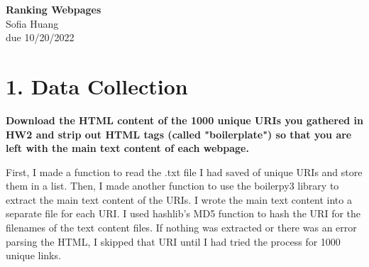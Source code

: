 \documentclass[12pt]{article}
\begin{document}
\begin{centering}
{\large\textbf{Ranking Webpages}}\\ 
Sofia Huang\\
due 10/20/2022\\
\end{centering}


\section*{1. Data Collection}
\noindent \textbf{Download the HTML content of the 1000 unique URIs you gathered in HW2 and strip out HTML tags (called "boilerplate") so that you are left with the main text content of each webpage.}

First, I made a function to read the .txt file I had saved of unique URIs and store them in a list. Then, I made another function to use the boilerpy3 library to extract the main text content of the URIs. I wrote the main text content into a separate file for each URI. I used hashlib's MD5 function to hash the URI for the filenames of the text content files. If nothing was extracted or there was an error parsing the HTML, I skipped that URI until I had tried the process for 1000 unique links. 
\end{document}
